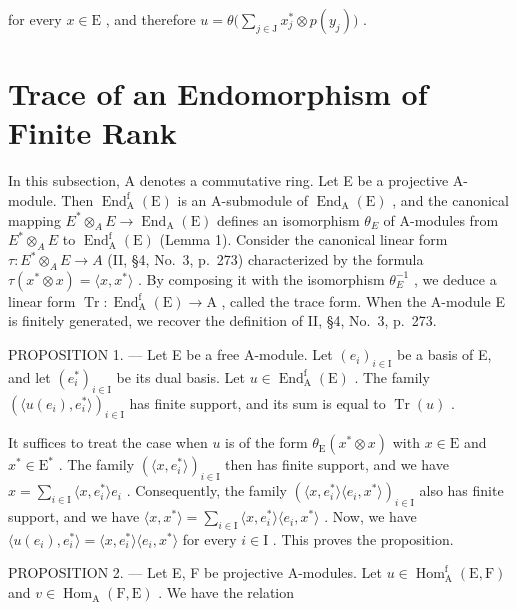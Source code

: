 for every \(x \in \mathrm{E}\) , and therefore \(u = \theta\big(\sum_{j \in \mathrm{J}} x_j^* \otimes p(y_j)\big)\) .

\section{Trace of an Endomorphism of Finite Rank}

In this subsection, A denotes a commutative ring. Let E be a projective A-module. Then \(\operatorname{End}_{\mathrm{A}}^{\mathrm{f}}(\mathrm{E})\) is an A-submodule of \(\operatorname{End}_{\mathrm{A}}(\mathrm{E})\) , and the canonical mapping \(E^{*}\otimes_{A}E\to\operatorname{End}_{\mathrm{A}}(\mathrm{E})\) defines an isomorphism \(\theta_{E}\) of A-modules from \(E^{*}\otimes_{A}E\) to \(\operatorname{End}_{\mathrm{A}}^{\mathrm{f}}(\mathrm{E})\) (Lemma 1). Consider the canonical linear form \(\tau:E^{*}\otimes_{A}E\to A\) (II, §4, No.~3, p.~273) characterized by the formula \(\tau(x^{*}\otimes x)=\langle x,x^{*}\rangle\) . By composing it with the isomorphism \(\theta_{E}^{-1}\) , we deduce a linear form \(\operatorname{Tr}: \operatorname{End}_{\mathrm{A}}^{\mathrm{f}}(\mathrm{E})\to\mathrm{A}\) , called the trace form. When the A-module E is finitely generated, we recover the definition of II, §4, No.~3, p.~273.

PROPOSITION 1. --- Let E be a free A-module. Let \((e_{i})_{i\in\mathrm{I}}\) be a basis of E, and let \((e_{i}^{*})_{i\in\mathrm{I}}\) be its dual basis. Let \(u\in\operatorname{End}_{\mathrm{A}}^{\mathrm{f}}(\mathrm{E})\) . The family \((\langle u(e_{i}),e_{i}^{*}\rangle)_{i\in\mathrm{I}}\) has finite support, and its sum is equal to \(\operatorname{Tr}(u)\) .

It suffices to treat the case when \(u\) is of the form \(\theta_{\mathrm{E}}(x^{*} \otimes x)\) with \(x \in \mathrm{E}\) and \(x^{*} \in \mathrm{E}^{*}\) . The family \((\langle x, e_{i}^{*} \rangle)_{i \in \mathrm{I}}\) then has finite support, and we have \(x = \sum_{i \in \mathrm{I}} \langle x, e_{i}^{*} \rangle e_{i}\) . Consequently, the family \((\langle x, e_{i}^{*} \rangle \langle e_{i}, x^{*} \rangle)_{i \in \mathrm{I}}\) also has finite support, and we have \(\langle x, x^{*} \rangle = \sum_{i \in \mathrm{I}} \langle x, e_{i}^{*} \rangle \langle e_{i}, x^{*} \rangle\) . Now, we have \(\langle u(e_{i}), e_{i}^{*} \rangle = \langle x, e_{i}^{*} \rangle \langle e_{i}, x^{*} \rangle\) for every \(i \in \mathrm{I}\) . This proves the proposition.

PROPOSITION 2. --- Let E, F be projective A-modules. Let \(u \in \operatorname{Hom}_{\mathrm{A}}^{\mathrm{f}}(\mathrm{E}, \mathrm{F})\) and \(v \in \operatorname{Hom}_{\mathrm{A}}(\mathrm{F}, \mathrm{E})\) . We have the relation

